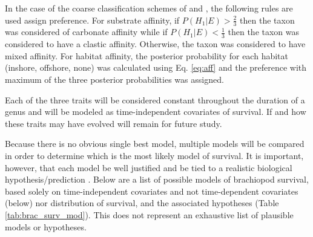 \documentclass[12pt,letterpaper]{article}
\begin{document}
In the case of the coarse classification schemes of \citet{Foote2006} and \citet{Kiessling2007}, the following rules are used assign preference. For substrate affinity, if \(P(H_{1}|E) > \frac{2}{3}\) then the taxon was considered of carbonate affinity while if \(P(H_{1}|E) < \frac{1}{3}\) then the taxon was considered to have a clastic affinity. Otherwise, the taxon was considered to have mixed affinity. For habitat affinity, the posterior probability for each habitat (inshore, offshore, none) was calculated using Eq. \ref{eq:aff} and the preference with maximum of the three posterior probabilities was assigned.

Each of the three traits will be considered constant throughout the duration of a genus and will be modeled as time-independent covariates of survival. If and how these traits may have evolved will remain for future study. 

Because there is no obvious single best model, multiple models will be compared in order to determine which is the most likely model of survival. It is important, however, that each model be well justified and be tied to a realistic biological hypothesis/prediction \citep{Burnham2002a}. Below are a list of possible models of brachiopod survival, based solely on time-independent covariates and not time-dependent covariates (below) nor distribution of survival, and the associated hypotheses (Table \ref{tab:brac_surv_mod}). This does not represent an exhaustive list of plausible models or hypotheses.
\end{document}
